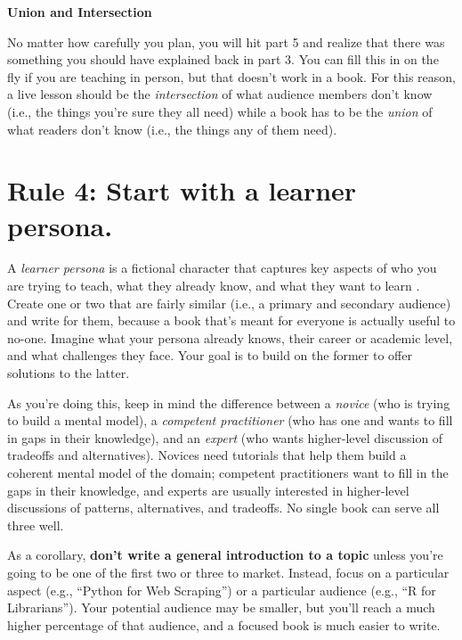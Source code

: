 \documentclass[10pt,letterpaper]{article}
\begin{document}
\begin{mdframed}
\textbf{Union and Intersection}

\noindent
No matter how carefully you plan, you will hit part 5 and realize that
there was something you should have explained back in part 3.  You can
fill this in on the fly if you are teaching in person, but that
doesn't work in a book.  For this reason, a live lesson should be the
\emph{intersection} of what audience members don't know (i.e., the
things you're sure they all need) while a book has to be the
\emph{union} of what readers don't know (i.e., the things any of them
need).
\end{mdframed}

\section*{Rule 4: Start with a learner persona.}

A \emph{learner persona} is a fictional character that captures key
aspects of who you are trying to teach, what they already know, and
what they want to learn \cite{Wi2019}.  Create one or two that are
fairly similar (i.e., a primary and secondary audience) and write for
them, because a book that's meant for everyone is actually useful to
no-one.  Imagine what your persona already knows, their career or
academic level, and what challenges they face.  Your goal is to build
on the former to offer solutions to the latter.

As you're doing this, keep in mind the difference between a
\emph{novice} (who is trying to build a mental model), a
\emph{competent practitioner} (who has one and wants to fill in gaps
in their knowledge), and an \emph{expert} (who wants higher-level
discussion of tradeoffs and alternatives).  Novices need tutorials
that help them build a coherent mental model of the domain; competent
practitioners want to fill in the gaps in their knowledge, and experts
are usually interested in higher-level discussions of patterns,
alternatives, and tradeoffs.  No single book can serve all three well.

As a corollary, \textbf{don't write a general introduction to a topic}
unless you're going to be one of the first two or three to market.
Instead, focus on a particular aspect (e.g., ``Python for Web
Scraping'') or a particular audience (e.g., ``R for Librarians'').
Your potential audience may be smaller, but you'll reach a much higher
percentage of that audience, and a focused book is much easier to
write.
\end{document}
